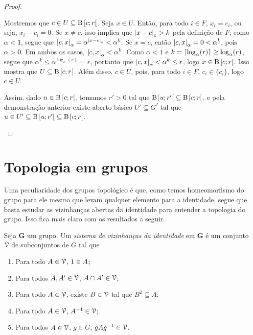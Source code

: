 \begin{proof}
\begin{itemize}
	Mostremos que $c \in U \subseteq \mathrm{B}\left[{c};{r}\right[$. Seja $x \in U$. Então, para todo $i \in F$, $x_i=c_i$, ou seja, $x_i-c_i=0$. Se $x \neq c$, isso implica que $\left\vert{x-c}\right\vert_{\circ} > k$ pela definição de $F$; como $\alpha < 1$, segue que $\left\vert{c},{x}\right\vert_\alpha = \alpha^{\left\vert{x-c}\right\vert_{\circ}} < \alpha^k$. Se $x=c$, então $\left\vert{c},{x}\right\vert_\alpha = 0 < \alpha^k$, pois $\alpha > 0$. Em ambos os casos, $\left\vert{c},{x}\right\vert_\alpha < \alpha^k$. Como $\alpha < 1$ e $k = \left\lceil{\log_{\alpha}(r)}\right\rceil \geq \log_{\alpha}(r)$, segue que $\alpha^k \leq \alpha^{\log_{\alpha}(r)} = r$, portanto que $\left\vert{c},{x}\right\vert_\alpha < \alpha^k \leq r$, logo $x \in \mathrm{B}\left[{c};{r}\right[$. Isso mostra que $U \subseteq \mathrm{B}\left[{c};{r}\right[$. Além disso, $c \in U$, pois, para todo $i \in F$, $c_i \in \{c_i\}$, logo $c \in U$.

	Assim, dado $u \in \mathrm{B}\left[{c};{r}\right[$, tomamos $r'>0$ tal que $\mathrm{B}\left[{u};{r'}\right[ \subseteq \mathrm{B}\left[{c};{r}\right[$, e pela demonstração anterior existe aberto básico $U' \subseteq G^{I}$ tal que $u \in U' \subseteq \mathrm{B}\left[{u};{r'}\right[ \subseteq \mathrm{B}\left[{c};{r}\right[$.
	\end{itemize}
\end{proof}


\section{Topologia em grupos}

Uma peculiaridade dos grupos topológico é que, como temos homeomorfismo do grupo para ele mesmo que levam qualquer elemento para a identidade, segue que basta estudar as vizinhanças abertas da identidade para entender a topologia do grupo. Isso fica mais claro com os resultados a seguir.

\begin{definition}
Seja $\bm G$ um grupo. Um \emph{sistema de vizinhanças da identidade} em $\bm G$ é um conjunto $\mathcal{V}$ de subconjuntos de $G$ tal que
	\begin{enumerate}
	\item Para todo $A \in \mathcal{V}$, $1 \in A$;
	\item Para todos $A,A' \in \mathcal{V}$, $A \cap A' \in \mathcal{V}$;
	\item Para todo $A \in \mathcal{V}$, existe $B \in \mathcal{V}$ tal que $B^2 \subseteq A$;
	\item	 Para todo $A \in \mathcal{V}$, $A^{-1} \in \mathcal{V}$;
	\item Para todos $A \in \mathcal{V}$, $g \in G$, $gAg^{-1} \in \mathcal{V}$.	
	\end{enumerate}
\end{definition}

